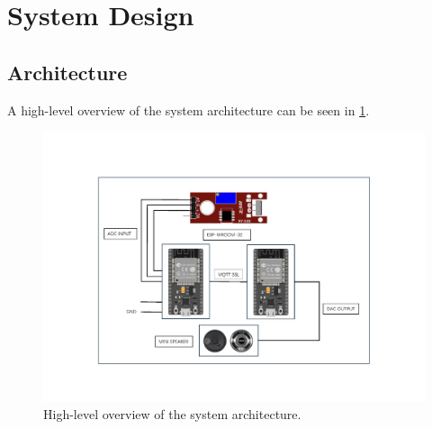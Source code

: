 \documentclass[conference]{IEEEtran}
\begin{document}

\section{System Design}
\label{sec:system_design}

\subsection{Architecture}

A high-level overview of the system architecture can be seen in \cref{fig:architecture}.

\begin{figure}[h]
    \hspace*{-0.4cm}
    \includegraphics[width=1.2\linewidth]{assets/diagram.png}
    \vspace{-1.5cm}
    \caption{High-level overview of the system architecture.}
    \label{fig:architecture}
\end{figure}
\end{document}
